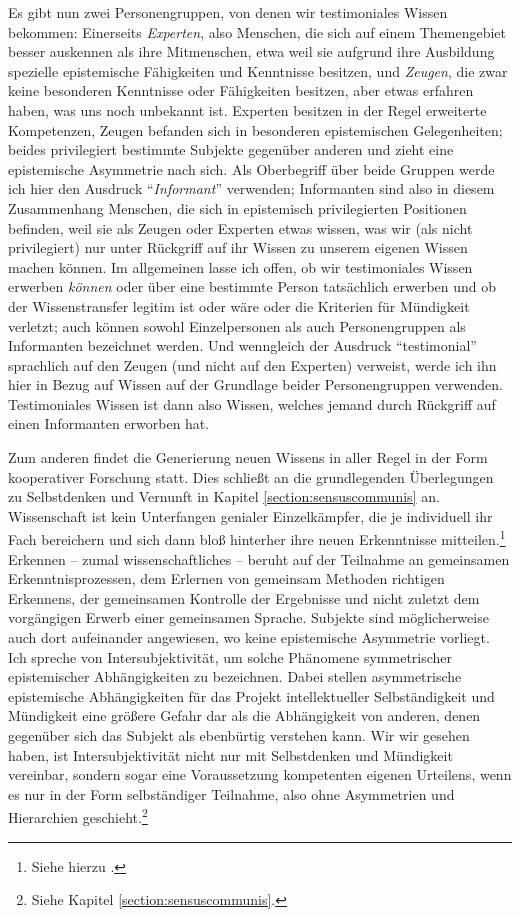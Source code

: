 \begin{nummerierung}
Es gibt nun zwei Personengruppen, von denen wir testimoniales Wissen bekommen:
Einerseits \emph{Experten}, also Menschen, die sich auf einem Themengebiet besser auskennen
als ihre Mitmenschen, etwa weil sie aufgrund ihre Ausbildung spezielle
epistemische Fähigkeiten und Kenntnisse besitzen, und \emph{Zeugen}, die zwar keine
besonderen Kenntnisse oder Fähigkeiten besitzen, aber etwas erfahren haben, was
uns noch unbekannt ist. Experten besitzen in der Regel erweiterte Kompetenzen,
Zeugen befanden sich in besonderen epistemischen Gelegenheiten; beides
privilegiert bestimmte Subjekte gegenüber anderen und zieht eine epistemische
Asymmetrie nach sich. Als Oberbegriff über beide Gruppen werde ich hier den
Ausdruck \enquote{\emph{Informant}} verwenden; Informanten sind also in diesem
Zusammenhang Menschen, die sich in epistemisch privilegierten Positionen
befinden, weil sie als Zeugen oder Experten etwas wissen, was wir (als nicht
privilegiert) nur unter Rückgriff auf ihr Wissen zu unserem eigenen Wissen
machen können. Im allgemeinen lasse ich offen, ob wir testimoniales Wissen
erwerben \emph{können} oder über eine bestimmte Person tatsächlich erwerben und
ob der Wissenstransfer legitim ist oder wäre oder die Kriterien für Mündigkeit
verletzt; auch können sowohl Einzelpersonen als auch Personengruppen als
Informanten bezeichnet werden. Und wenngleich der Ausdruck \enquote{testimonial}
sprachlich auf den Zeugen (und nicht auf den Experten) verweist, werde ich ihn
hier in Bezug auf Wissen auf der Grundlage beider Personengruppen verwenden.
Testimoniales Wissen ist dann also Wissen, welches jemand durch Rückgriff auf
einen Informanten erworben hat.

\item Zum anderen findet die Generierung neuen Wissens in aller Regel in der
Form kooperativer Forschung statt. Dies schließt an die grundlegenden
Überlegungen zu Selbstdenken und Vernunft in Kapitel
\ref{section:sensuscommunis} an.
Wissenschaft ist kein Unterfangen genialer Einzelkämpfer, die je individuell ihr
Fach bereichern und sich dann bloß hinterher ihre neuen Erkenntnisse
mitteilen.\footnote{Siehe hierzu
\cite[][49--52]{Wilholt:SozialeErkenntnistheorie2007}.} Erkennen -- zumal
wissenschaftliches -- beruht auf der Teilnahme an gemeinsamen
Erkenntnisprozessen, dem Erlernen von gemeinsam Methoden richtigen Erkennens,
der gemeinsamen Kontrolle der Ergebnisse und nicht zuletzt dem vorgängigen
Erwerb einer gemeinsamen Sprache. Subjekte sind möglicherweise auch dort
aufeinander angewiesen, wo keine epistemische Asymmetrie vorliegt. Ich spreche
von Intersubjektivität, um solche
Phänomene symmetrischer epistemischer Abhängigkeiten zu bezeichnen. Dabei
stellen asymmetrische epistemische Abhängigkeiten für das Projekt
intellektueller Selbständigkeit und Mündigkeit eine größere Gefahr dar
als die Abhängigkeit von anderen, denen gegenüber sich das Subjekt als
ebenbürtig verstehen kann. Wir wir gesehen haben, ist Intersubjektivität nicht
nur mit Selbstdenken und Mündigkeit vereinbar, sondern sogar eine Voraussetzung
kompetenten eigenen Urteilens, wenn es nur in der Form selbständiger Teilnahme,
also ohne Asymmetrien und Hierarchien geschieht.\footnote{Siehe Kapitel
\ref{section:sensuscommunis}.}
\end{nummerierung}

